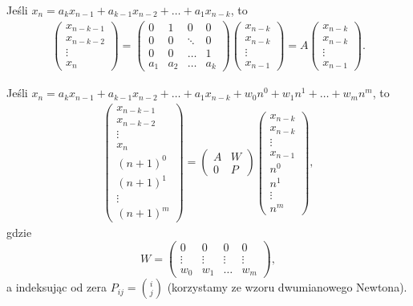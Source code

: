 \documentclass[a4paper, 12pt]{article}
\newcommand{\+}{\enspace}
\begin{document}
Jeśli $x_n = a_k x_{n-1} + a_{k-1} x_{n-2} + … + a_1 x_{n-k}$, to
\begin{align*}
\begin{pmatrix}
	x_{n-k-1} \\
	x_{n-k-2} \\
	\vdots \\
	x_{n}
\end{pmatrix}
=
\begin{pmatrix}
	0   &  1      & 0 & 0 \\
	0   &  0  & \ddots & 0 \\
	0   &  0  & \dots & 1 \\
	a_1 & a_2 & \dots & a_k
\end{pmatrix}
\begin{pmatrix}
	x_{n-k} \\
	x_{n-k} \\
	\vdots \\
	x_{n-1}
\end{pmatrix}
=
A
\begin{pmatrix}
	x_{n-k} \\
	x_{n-k} \\
	\vdots \\
	x_{n-1}
\end{pmatrix}.
\end{align*}


Jeśli $x_n = a_k x_{n-1} + a_{k-1} x_{n-2} + … + a_1 x_{n-k} + w_0n^0 + w_1n^1 + … + w_mn^m$, to
\begin{align*}
\begin{pmatrix}
	x_{n-k-1} \\
	x_{n-k-2} \\
	\vdots \\
	x_{n} \\
	(n+1)^0 \\
	(n+1)^1\\
	\vdots \\
	(n+1)^m
\end{pmatrix}
=
\begin{pmatrix}
	A & W \\
	0 & P
\end{pmatrix}
\begin{pmatrix}
	x_{n-k} \\
	x_{n-k} \\
	\vdots \\
	x_{n-1} \\
	n^0 \\
	n^1 \\
	\vdots \\
	n^m
\end{pmatrix},
\end{align*}
gdzie
$$
W =
\begin{pmatrix}
	0 & 0 & 0 & 0 \\
	\vdots & \vdots & \vdots & \vdots \\
	w_0 & w_1 & \dots & w_m
\end{pmatrix},$$
a indeksując od zera $P_{ij} = \binom{i}{j}$
(korzystamy ze wzoru dwumianowego Newtona).
\end{document}
